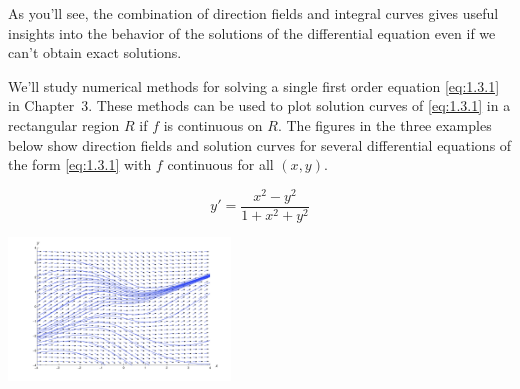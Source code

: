 \documentclass{ximera}
\begin{document}

As you'll  see, the combination of  direction fields and
 integral curves gives  useful insights into the behavior of
the solutions of the differential equation even if
we can't obtain exact solutions.

We'll  study numerical methods for solving a single first order
equation \eqref{eq:1.3.1} in {\color{red}Chapter~3}. These methods can be
used
to plot solution curves of \eqref{eq:1.3.1} in a rectangular region $R$ if $f$ is continuous on $R$. The figures in the three examples below show direction fields and solution
curves for several differential equations of the form \eqref{eq:1.3.1} with $f$
 continuous for all $(x,y)$.
 \begin{example}\label{ex:fig010302}
$$
 y'=\frac{x^2-y^2}{1+x^2+y^2}
 $$
 \begin{image}
  \includegraphics[height=1.5in]{fig010302.jpg}
\end{image}
\end{example}
\end{document}
